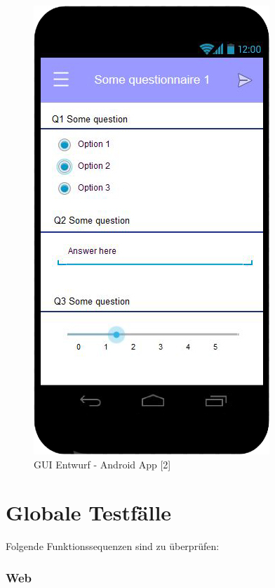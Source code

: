 \documentclass[a4paper]{scrreprt}
\begin{document}
            \vspace*{2cm}
	        \begin{figure}[ht]
                \centering
                \includegraphics[scale = 0.3]{android2.jpg}
                \caption{GUI Entwurf - Android App [2]}
            \end{figure}

    \chapter{Globale Testfälle}

        Folgende Funktionssequenzen sind zu \"uberpr\"ufen:

        \subsection{Web}
\end{document}
